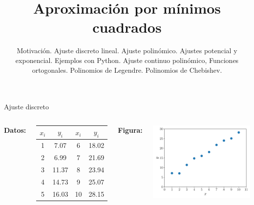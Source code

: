 \documentclass[9pt, aspectratio=169]{beamer}
\title{Aproximación por mínimos cuadrados}
\subtitle{Motivación. Ajuste discreto lineal. Ajuste polinómico. Ajustes potencial y exponencial. Ejemplos con Python. Ajuste continuo polinómico, Funciones ortogonales. Polinomios de Legendre. Polinomios de Chebishev.}
\begin{document}
\maketitle

\begin{frame}[standout]
    \begin{center}
        {\Huge Ajuste discreto}
    \end{center}
\end{frame}

\begin{frame}
\begin{columns}[t]
\textbf{Datos:}

\begin{center}
\begin{tabular}{cccc}
\toprule
$x_i$ & $y_i$ & $x_i$ & $y_i$ \\
\midrule
 1 & 7.07 &  6 & 18.02 \\
 2 & 6.99 &  7 & 21.69 \\
 3 & 11.37 &  8 & 23.94 \\
 4 & 14.73 &  9 & 25.07 \\
 5 & 16.03 & 10 & 28.15 \\
\bottomrule
\end{tabular}
\end{center}

\textbf{Figura:}
\begin{center}
    \includegraphics[scale=0.40]{figs/fig-01.pdf}
\end{center}
\end{columns}
\end{frame}
\end{document}
